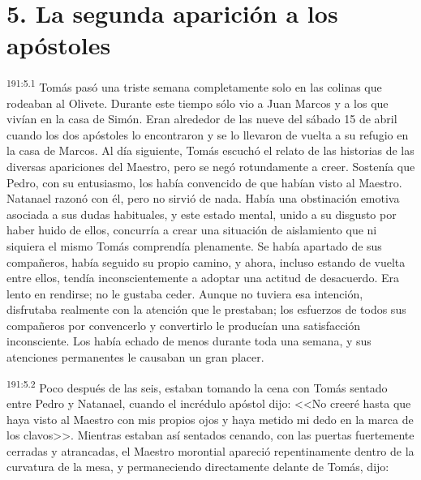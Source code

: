 \section*{5. La segunda aparición a los apóstoles}
\par 
\textsuperscript{191:5.1} Tomás pasó una triste semana completamente solo en las colinas que rodeaban al Olivete. Durante este tiempo sólo vio a Juan Marcos y a los que vivían en la casa de Simón. Eran alrededor de las nueve del sábado 15 de abril cuando los dos apóstoles lo encontraron y se lo llevaron de vuelta a su refugio en la casa de Marcos. Al día siguiente, Tomás escuchó el relato de las historias de las diversas apariciones del Maestro, pero se negó rotundamente a creer. Sostenía que Pedro, con su entusiasmo, los había convencido de que habían visto al Maestro. Natanael razonó con él, pero no sirvió de nada. Había una obstinación emotiva asociada a sus dudas habituales, y este estado mental, unido a su disgusto por haber huido de ellos, concurría a crear una situación de aislamiento que ni siquiera el mismo Tomás comprendía plenamente. Se había apartado de sus compañeros, había seguido su propio camino, y ahora, incluso estando de vuelta entre ellos, tendía inconscientemente a adoptar una actitud de desacuerdo. Era lento en rendirse; no le gustaba ceder. Aunque no tuviera esa intención, disfrutaba realmente con la atención que le prestaban; los esfuerzos de todos sus compañeros por convencerlo y convertirlo le producían una satisfacción inconsciente. Los había echado de menos durante toda una semana, y sus atenciones permanentes le causaban un gran placer.

\par 
\textsuperscript{191:5.2} Poco después de las seis, estaban tomando la cena con Tomás sentado entre Pedro y Natanael, cuando el incrédulo apóstol dijo: <<No creeré hasta que haya visto al Maestro con mis propios ojos y haya metido mi dedo en la marca de los clavos>>. Mientras estaban así sentados cenando, con las puertas fuertemente cerradas y atrancadas, el Maestro morontial apareció repentinamente dentro de la curvatura de la mesa, y permaneciendo directamente delante de Tomás, dijo:

